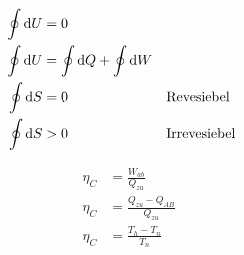 \begin{boxleft}
\end{boxleft}\begin{boxrightshaded}
\begin{align*}
\oint \mathop{}\!\mathrm{d} U&=0\\
\oint \mathop{}\!\mathrm{d} U&= \oint \mathop{}\!\mathrm{d} Q +\oint \mathop{}\!\mathrm{d} W\\
\oint \mathop{}\!\mathrm{d} S&=0 &&\text{Revesiebel}\\
\oint \mathop{}\!\mathrm{d} S&>0 &&\text{Irrevesiebel}\\
\end{align*}
\end{boxrightshaded}


\begin{boxleft}
\end{boxleft}\begin{boxrightshaded}
\begin{align*}
\eta_C&=\frac{W_{ab}}{Q_{zu}}\\
\eta_C&=\frac{Q_{zu}-Q_{AB}}{Q_{zu}}\\
\eta_C&=\frac{T_h-T_n}{T_n}
\end{align*}
\end{boxrightshaded}